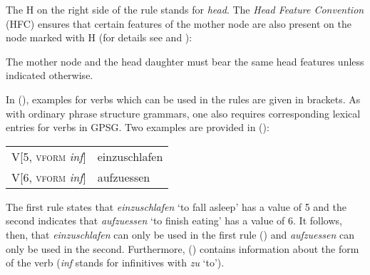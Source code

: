 The H on the right side of the rule stands for \emph{head}. The \emph{Head Feature Convention}
(HFC) ensures that certain features
of the mother node are also present on the node marked with H (for details see
\citealp*[Section~5.4]{GKPS85a} and \citealp[67]{Uszkoreit87a}):
\begin{principle-break}%
The mother node and the head daughter must bear the same head features unless indicated otherwise.
\end{principle-break}
%
In (), examples for verbs which can be used in the rules are given in brackets. As with ordinary phrase structure grammars, one also requires
corresponding lexical entries for verbs in GPSG. Two examples are provided in ():
\ea
\begin{tabular}[t]{@{}l@{~$\to$~}l@{}}
V[5, \textsc{vform} \emph{inf}]  & einzuschlafen\\
V[6, \textsc{vform} \emph{inf}]  & aufzuessen\\
\end{tabular}
\z
The first rule states that \emph{einzuschlafen} `to fall asleep' has a \subcat value of 5 and the second indicates that \emph{aufzuessen} `to finish eating'  has a
\subcat value of 6. It follows, then, that \emph{einzuschlafen} can only be used in the first rule () and \emph{aufzuessen} can
only be used in the second. Furthermore, () contains information about the form of the verb
(\emph{inf} stands for infinitives with \emph{zu} `to').

